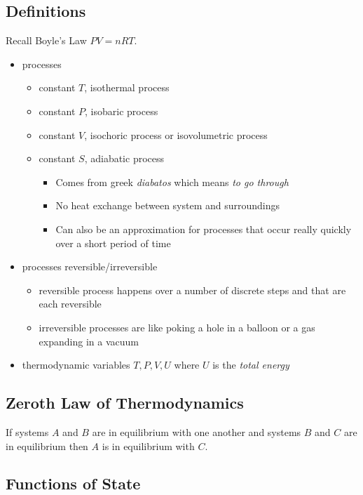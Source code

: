 \documentclass{article}
\begin{document}
\subsection{Definitions}

Recall Boyle's Law $PV = nRT$.

\begin{itemize}
    \item processes
    \begin{itemize}
        \item constant $T$, isothermal process
        \item constant $P$, isobaric process
        \item constant $V$, isochoric process or isovolumetric process
        \item constant $S$, adiabatic process
        \begin{itemize}
            \item Comes from greek \textit{diabatos} which means \textit{to go through}
            \item No heat exchange between system and surroundings
            \item Can also be an approximation for processes that occur really quickly over a short period of time
        \end{itemize}
    \end{itemize}
    \item processes reversible/irreversible
    \begin{itemize}
        \item reversible process happens over a number of discrete steps and that are each reversible
        \item irreversible processes are like poking a hole in a balloon or a gas expanding in a vacuum
    \end{itemize}
    \item thermodynamic variables $T, P, V, U$ where $U$ is the \textit{total energy}
\end{itemize}

\subsection{Zeroth Law of Thermodynamics}

If systems $A$ and $B$ are in equilibrium with one another and systems $B$ and $C$ are in equilibrium then $A$ is in equilibrium with $C$.

\subsection{Functions of State}
\end{document}
